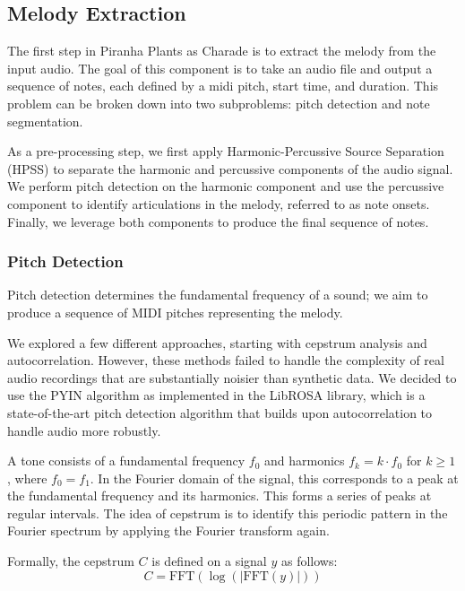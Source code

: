 \subsection{Melody Extraction}
\label{sec:melody_extraction}

The first step in Piranha Plants as Charade is to extract the melody from the input audio. The goal of this component is to take an audio file and output a sequence of notes, each defined by a midi pitch, start time, and duration. This problem can be broken down into two subproblems: pitch detection and note segmentation.

As a pre-processing step, we first apply Harmonic-Percussive Source Separation (HPSS) \autocite{HPSS:2010,HPSS:2014} to separate the harmonic and percussive components of the audio signal. We perform pitch detection on the harmonic component and use the percussive component to identify articulations in the melody, referred to as note onsets. Finally, we leverage both components to produce the final sequence of notes.

\subsubsection{Pitch Detection}

Pitch detection determines the fundamental frequency of a sound; we aim to produce a sequence of MIDI pitches representing the melody.

We explored a few different approaches, starting with cepstrum analysis and autocorrelation. However, these methods failed to handle the complexity of real audio recordings that are substantially noisier than synthetic data. We decided to use the PYIN algorithm as implemented in the LibROSA library, which is a state-of-the-art pitch detection algorithm that builds upon autocorrelation to handle audio more robustly.


A tone consists of a fundamental frequency $f_0$ and harmonics $f_k = k \cdot f_0$ for $k \geq 1$, where $f_0 = f_1$. In the Fourier domain of the signal, this corresponds to a peak at the fundamental frequency and its harmonics. This forms a series of peaks at regular intervals. The idea of cepstrum is to identify this periodic pattern in the Fourier spectrum by applying the Fourier transform again.

Formally, the cepstrum $C$ is defined on a signal $y$ as follows:
$$C = \text{FFT}\left(\log\left(\left|\text{FFT}\left(y\right)\right|\right)\right)$$

